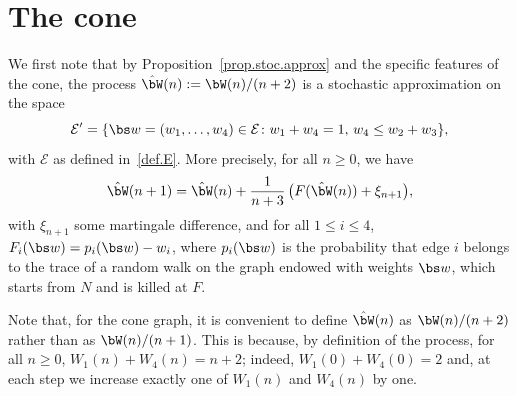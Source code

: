 \section{The cone}\label{sec:cornet}
We first note that by Proposition~\ref{prop.stoc.approx} and the specific feature{s} of the cone, the process $\hat \bW(n) := \bW(n)/(n+2)$ is a stochastic approximation on the space
\[
\mathcal E' = \{\bs w = (w_1, \ldots, w_4)\in \mathcal E \colon w_1 + w_4 = 1,\, w_4\leq w_2+w_3\},
\]
with $\mathcal E$ as defined in~\eqref{def.E}.
More precisely, for all $n\geq 0$, we have
\[
\hat \bW(n+1) = \hat\bW(n) +
\frac1{n+3}\,\big(F(\hat\bW(n))+ \xi_{n+1}\big),
\]
with $\xi_{n+1}$ some martingale difference, and
for all $1\leq i\leq 4$, $F_i(\bs w) = p_i(\bs w) - w_i$, where $p_i(\bs w)$ is the probability that edge $i$ belongs to the trace of a random walk on the graph endowed with weights $\bs w$, which starts
from $N$ and is killed at $F$.

{\begin{remark}
Note that, for the cone graph, it is convenient to define $\hat\bW(n)$ as $\bW(n)/(n+2)$ rather than as $\bW(n)/(n+1)$. This is because, by definition of the process, for all $n\geq 0$, $W_1(n) + W_4(n) = n+2$; indeed, $W_1(0) + W_4(0) = 2$ and, at each step we increase exactly one of $W_1(n)$ and $W_4(n)$ by one.
\end{remark}}

